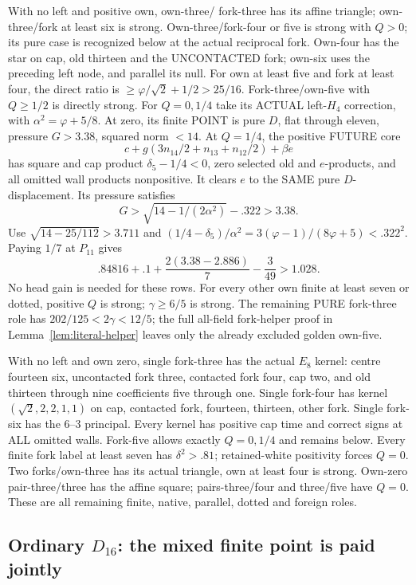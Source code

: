\documentclass[11pt]{article}
\begin{document}
With no left and positive own, own-three/
fork-three has its affine triangle;
own-three/fork at least six is strong.
Own-three/fork-four or five is strong
with \(Q>0\); its pure case is recognized
below at the actual reciprocal fork.
Own-four has the star on cap, old
thirteen and the UNCONTACTED fork;
own-six uses the preceding left node,
and parallel its null.
For own at least five and fork at
least four, the direct ratio is
\(\ge\varphi/\sqrt2+1/2>25/16\).
Fork-three/own-five with \(Q\ge1/2\)
is directly strong.
For \(Q=0,1/4\) take its ACTUAL
left-\(H_4\) correction, with
\(\alpha^2=\varphi+5/8\).
At zero, its finite POINT is pure \(D\),
flat through eleven, pressure \(G>3.38\),
squared norm \(<14\).
At \(Q=1/4\), the positive FUTURE core
\[
             c+g(3n_{14}/2+n_{13}+n_{12}/2)+\beta e
\]
has square and cap product
\(\delta_5-1/4<0\), zero selected old
and \(e\)-products, and all omitted
wall products nonpositive.
It clears \(e\) to the SAME pure
\(D\)-displacement.
Its pressure satisfies
\[
             G>\sqrt{14-1/(2\alpha^2)}-.322>3.38 .
\]
Use \(\sqrt{14-25/112}>3.711\) and
\((1/4-\delta_5)/\alpha^2
=3(\varphi-1)/(8\varphi+5)<.322^2\).
Paying \(1/7\) at \(P_{11}\) gives
\[
                 .84816+.1+{\frac{2(3.38-2.886)}{7}}-{\frac{3}{49}}>1.028 .
\]
No head gain is needed for these rows.
For every other own finite at least
seven or dotted, positive \(Q\) is
strong; \(\gamma\ge6/5\) is strong.
The remaining PURE fork-three role
has \(202/125<2\gamma<12/5\);
the full all-field fork-helper proof
in Lemma~\ref{lem:literal-helper}
leaves only the already excluded golden
own-five.

With no left and own zero, single
fork-three has the actual \(E_8\) kernel:
centre fourteen six, uncontacted fork
three, contacted fork four, cap two,
and old thirteen through nine
coefficients five through one.
Single fork-four has kernel
\((\sqrt2,2,2,1,1)\) on cap, contacted
fork, fourteen, thirteen, other fork.
Single fork-six has the \(6\)--\(3\)
principal.
Every kernel has positive cap time and
correct signs at ALL omitted walls.
Fork-five allows exactly \(Q=0,1/4\)
and remains below.
Every finite fork label at least seven
has \(\delta^2>.81\); retained-white
positivity forces \(Q=0\).
Two forks/own-three has its actual
triangle, own at least four is strong.
Own-zero pair-three/three has the affine
square; pairs-three/four and three/five
have \(Q=0\).
These are all remaining finite, native,
parallel, dotted and foreign roles.

\subsection[Ordinary D16: the mixed finite point is paid jointly]{Ordinary \(D_{16}\): the mixed finite point is paid jointly}
\label{app:arithD16ordinarymixed}
\end{document}
